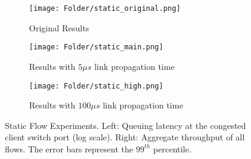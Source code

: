 \documentclass[10pt,conference,compsocconf]{IEEEtran}
\begin{document}
\begin{figure}[t]
  \centering
  \begin{subfigure}{\linewidth}
    \centering
    \texttt{[image: Folder/static\_original.png]}
    \caption{Original Results \cite{HULL}}
  \end{subfigure}

  \begin{subfigure}{\linewidth}
    \centering
    \texttt{[image: Folder/static\_main.png]}
    \caption{Results with $5\mu s$ link propagation time}
  \end{subfigure}  
  
  \begin{subfigure}{\linewidth}
    \centering
    \texttt{[image: Folder/static\_high.png]}
    \caption{Results with $100\mu s$ link propagation time}
  \end{subfigure}
  
  \setlength{\belowcaptionskip}{-0.4cm} 
  \caption{Static Flow Experiments. Left: Queuing latency at the congested client switch port (log scale). Right: Aggregate throughput of all flows. The error bars represent the $99^{th}$ percentile.}  
  \label{fig:static_main}
\end{figure} 
\end{document}
